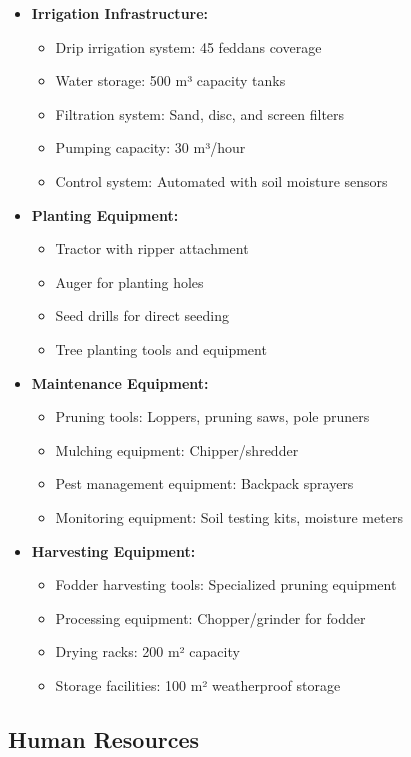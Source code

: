 \begin{itemize}
    \item \textbf{Irrigation Infrastructure:}
    \begin{itemize}
        \item Drip irrigation system: 45 feddans coverage
        \item Water storage: 500 m³ capacity tanks
        \item Filtration system: Sand, disc, and screen filters
        \item Pumping capacity: 30 m³/hour
        \item Control system: Automated with soil moisture sensors
    \end{itemize}
    \item \textbf{Planting Equipment:}
    \begin{itemize}
        \item Tractor with ripper attachment
        \item Auger for planting holes
        \item Seed drills for direct seeding
        \item Tree planting tools and equipment
    \end{itemize}
    \item \textbf{Maintenance Equipment:}
    \begin{itemize}
        \item Pruning tools: Loppers, pruning saws, pole pruners
        \item Mulching equipment: Chipper/shredder
        \item Pest management equipment: Backpack sprayers
        \item Monitoring equipment: Soil testing kits, moisture meters
    \end{itemize}
    \item \textbf{Harvesting Equipment:}
    \begin{itemize}
        \item Fodder harvesting tools: Specialized pruning equipment
        \item Processing equipment: Chopper/grinder for fodder
        \item Drying racks: 200 m² capacity
        \item Storage facilities: 100 m² weatherproof storage
    \end{itemize}
\end{itemize}

\subsection{Human Resources}

